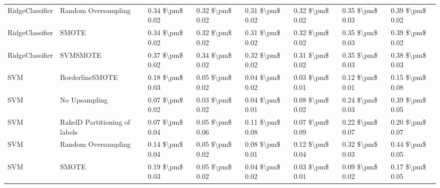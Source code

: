 \begin{tabular}{llllllll}
                RidgeClassifier &           Random Oversampling & 0.34 \$\textbackslash pm\$ 0.02 &           0.32 \$\textbackslash pm\$ 0.02 &       0.31 \$\textbackslash pm\$ 0.02 &        0.32 \$\textbackslash pm\$ 0.02 &                         0.35 \$\textbackslash pm\$ 0.03 & 0.39 \$\textbackslash pm\$ 0.02 \\
                RidgeClassifier &                         SMOTE & 0.34 \$\textbackslash pm\$ 0.02 &           0.32 \$\textbackslash pm\$ 0.02 &       0.31 \$\textbackslash pm\$ 0.02 &        0.32 \$\textbackslash pm\$ 0.02 &                         0.35 \$\textbackslash pm\$ 0.03 & 0.39 \$\textbackslash pm\$ 0.02 \\
                RidgeClassifier &                      SVMSMOTE & 0.37 \$\textbackslash pm\$ 0.02 &           0.34 \$\textbackslash pm\$ 0.02 &       0.32 \$\textbackslash pm\$ 0.02 &        0.31 \$\textbackslash pm\$ 0.02 &                         0.35 \$\textbackslash pm\$ 0.03 & 0.38 \$\textbackslash pm\$ 0.03 \\
                            SVM &               BorderlineSMOTE & 0.18 \$\textbackslash pm\$ 0.03 &           0.05 \$\textbackslash pm\$ 0.02 &       0.04 \$\textbackslash pm\$ 0.02 &        0.03 \$\textbackslash pm\$ 0.01 &                         0.12 \$\textbackslash pm\$ 0.01 & 0.15 \$\textbackslash pm\$ 0.08 \\
                            SVM &                 No Upsampling & 0.07 \$\textbackslash pm\$ 0.02 &           0.03 \$\textbackslash pm\$ 0.02 &       0.04 \$\textbackslash pm\$ 0.01 &        0.08 \$\textbackslash pm\$ 0.02 &                         0.24 \$\textbackslash pm\$ 0.03 & 0.39 \$\textbackslash pm\$ 0.05 \\
                            SVM & RakelD Partitioning of labels & 0.07 \$\textbackslash pm\$ 0.04 &           0.05 \$\textbackslash pm\$ 0.06 &       0.11 \$\textbackslash pm\$ 0.08 &        0.07 \$\textbackslash pm\$ 0.09 &                         0.22 \$\textbackslash pm\$ 0.07 & 0.20 \$\textbackslash pm\$ 0.07 \\
                            SVM &           Random Oversampling & 0.14 \$\textbackslash pm\$ 0.04 &           0.05 \$\textbackslash pm\$ 0.02 &       0.08 \$\textbackslash pm\$ 0.01 &        0.12 \$\textbackslash pm\$ 0.04 &                         0.32 \$\textbackslash pm\$ 0.03 & 0.44 \$\textbackslash pm\$ 0.05 \\
                            SVM &                         SMOTE & 0.19 \$\textbackslash pm\$ 0.03 &           0.05 \$\textbackslash pm\$ 0.02 &       0.04 \$\textbackslash pm\$ 0.02 &        0.03 \$\textbackslash pm\$ 0.01 &                         0.09 \$\textbackslash pm\$ 0.02 & 0.17 \$\textbackslash pm\$ 0.05 \\

\end{tabular}
